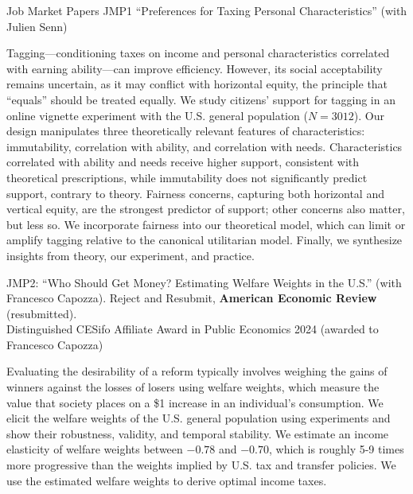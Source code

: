 \documentclass{resume} %
\begin{document}
\begin{rSection}{Job Market Papers}
  JMP1 ``Preferences for Taxing Personal Characteristics'' (with Julien Senn)

Tagging—conditioning taxes on income and personal characteristics correlated with earning ability—can improve efficiency. However, its social acceptability remains uncertain, as it may conflict with horizontal equity, the principle that ``equals'' should be treated equally. We study citizens' support for tagging in an online vignette experiment with the U.S. general population ($N=3012$). Our design manipulates three theoretically relevant features of characteristics: immutability, correlation with ability, and correlation with needs. Characteristics correlated with ability and needs receive higher support, consistent with theoretical prescriptions, while immutability does not significantly predict support, contrary to theory. Fairness concerns, capturing both horizontal and vertical equity, are the strongest predictor of support; other concerns also matter, but less so. We incorporate fairness into our theoretical model, which can limit or amplify tagging relative to the canonical utilitarian model. Finally, we synthesize insights from theory, our experiment, and practice.

  JMP2:   ``Who Should Get Money? Estimating Welfare Weights in the U.S.'' (with Francesco Capozza). Reject and Resubmit, \textbf{American Economic Review} (resubmitted). \\ \vspace{0.6em}
  { \normalsize  \hspace*{0.6em} Distinguished CESifo Affiliate Award in Public Economics 2024 (awarded to Francesco Capozza)} 

  Evaluating the desirability of a reform typically involves weighing the gains of winners against the losses of losers using welfare weights, which measure the value that society places on a \$1 increase in an individual's consumption. We elicit the welfare weights of the U.S. general population using experiments and show their robustness, validity, and temporal stability. We estimate an income elasticity of welfare weights between $-0.78$ and $-0.70$, which is roughly 5-9 times more progressive than the weights implied by U.S. tax and transfer policies. We use the estimated welfare weights to derive optimal income taxes.
\end{rSection}
\end{document}
